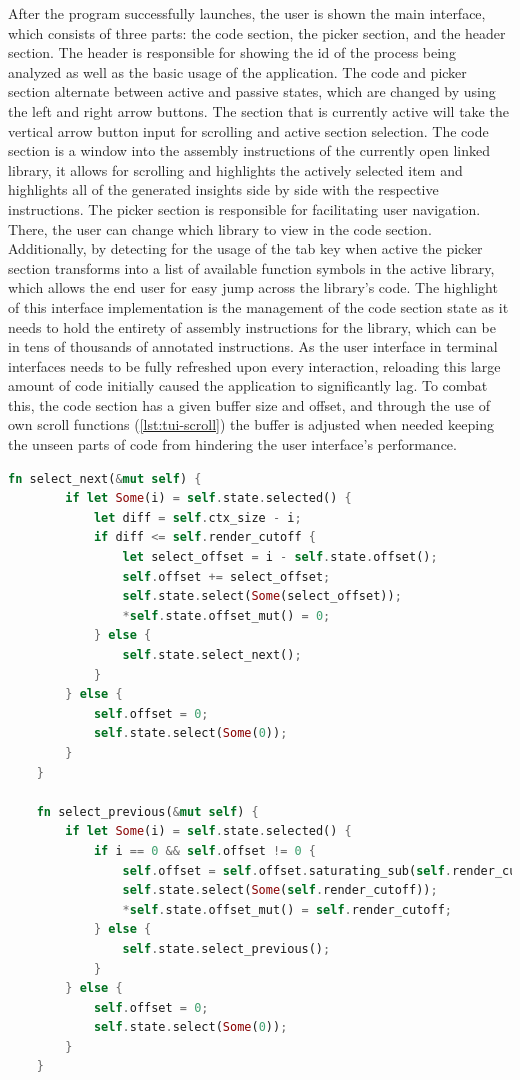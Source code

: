 After the program successfully launches, the user is shown the main interface, which consists of three parts: the code section, the picker section, and the header section.
The header is responsible for showing the id of the process being analyzed as well as the basic usage of the application.
The code and picker section alternate between active and passive states, which are changed by using the left and right arrow buttons.
The section that is currently active will take the vertical arrow button input for scrolling and active section selection.
The code section is a window into the assembly instructions of the currently open linked library, it allows for scrolling and highlights the actively selected item and highlights all of the generated insights side by side with the respective instructions.
The picker section is responsible for facilitating user navigation.
There, the user can change which library to view in the code section.
Additionally, by detecting for the usage of the tab key when active the picker section transforms into a list of available function symbols in the active library, which allows the end user for easy jump across the library's code.
The highlight of this interface implementation is the management of the code section state as it needs to hold the entirety of assembly instructions for the library, which can be in tens of thousands of annotated instructions.
As the user interface in terminal interfaces needs to be fully refreshed upon every interaction, reloading this large amount of code initially caused the application to significantly lag.
To combat this, the code section has a given buffer size and offset, and through the use of own scroll functions (\autoref{lst:tui-scroll}) the buffer is adjusted when needed keeping the unseen parts of code from hindering the user interface's performance.

\begin{lstlisting}[caption=\label{lst:tui-scroll}{Custom overlays over the basic scroll functions}, language=Rust]
    fn select_next(&mut self) {
        if let Some(i) = self.state.selected() {
            let diff = self.ctx_size - i;
            if diff <= self.render_cutoff {
                let select_offset = i - self.state.offset();
                self.offset += select_offset;
                self.state.select(Some(select_offset));
                *self.state.offset_mut() = 0;
            } else {
                self.state.select_next();
            }
        } else {
            self.offset = 0;
            self.state.select(Some(0));
        }
    }

    fn select_previous(&mut self) {
        if let Some(i) = self.state.selected() {
            if i == 0 && self.offset != 0 {
                self.offset = self.offset.saturating_sub(self.render_cutoff);
                self.state.select(Some(self.render_cutoff));
                *self.state.offset_mut() = self.render_cutoff;
            } else {
                self.state.select_previous();
            }
        } else {
            self.offset = 0;
            self.state.select(Some(0));
        }
    }
\end{lstlisting}

